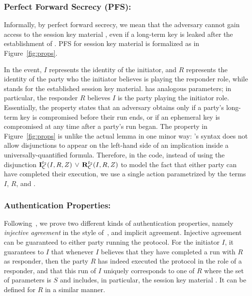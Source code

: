 \subsubsection{Perfect Forward Secrecy (PFS): }
\label{sec:secrecy}
Informally, by perfect forward secrecy, we mean that the adversary cannot gain access to the session key material \mSessKey{}, even if a long-term key is leaked after the establishment of \mSessKey{}.
%
PFS for session key material \mSessKey{} is formalized as \mPredPfs{} in Figure~\ref{fig:props}.

In the \mIComplete{} event, $I$ represents the identity of the initiator, and $R$ represents the identity of the party who the initiator believes is playing the responder role, while \mSessKey{} stands for the established session key material.
%
\mRComplete{} has analogous parameters; in particular, the responder $R$ believes $I$ is the party playing the initiator role.
%
Essentially, the property states that an adversary obtains \mSessKey{} only if a party's long-term key is compromised before their run ends, or if an ephemeral key is compromised at any time after a party's run began.
%
The property in Figure~\ref{fig:props} is unlike the actual \mTamarin{} lemma in one minor way: \mTamarin's syntax does not allow disjunctions to appear on the left-hand side of an implication inside a universally-quantified formula.
%
Therefore, in the \mTamarin{} code, instead of using the disjunction $\mathbf{I}_{\textsf{C}}^{t_2}(I, R, Z)\, \lor\,  \mathbf{R}_{\textsf{C}}^{t_2}(I, R, Z)$ to model the fact that either party can have completed their execution, we use a single action parametrized by the terms $I$, $R$, and \mSessKey.

\subsubsection{Authentication Properties:}
\label{sec:authenticationDef}
Following~\cite{Norr21}, we prove two different kinds of authentication properties, namely \emph{injective agreement} in the style of~\cite{DBLP:conf/csfw/Lowe97a}, and implicit agreement.
%
Injective agreement can be guaranteed to either party running the protocol.
%
For the initiator $I$, it guarantees to $I$ that whenever $I$ believes that they have completed a run with $R$ as responder, then the party $R$ has indeed executed the protocol in the role of a responder, and that this run of $I$ uniquely corresponds to one of $R$ where the set of parameters is $S$ and includes, in particular, the session key material \mSessKey{}.
%
It can be defined for $R$ in a similar manner.

